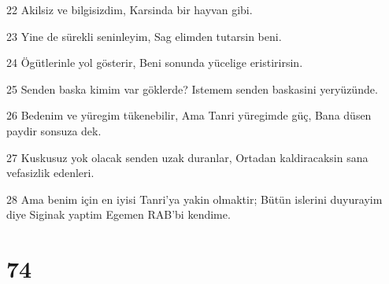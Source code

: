 \par 22 Akilsiz ve bilgisizdim, Karsinda bir hayvan gibi.
\par 23 Yine de sürekli seninleyim, Sag elimden tutarsin beni.
\par 24 Ögütlerinle yol gösterir, Beni sonunda yücelige eristirirsin.
\par 25 Senden baska kimim var göklerde? Istemem senden baskasini yeryüzünde.
\par 26 Bedenim ve yüregim tükenebilir, Ama Tanri yüregimde güç, Bana düsen paydir sonsuza dek.
\par 27 Kuskusuz yok olacak senden uzak duranlar, Ortadan kaldiracaksin sana vefasizlik edenleri.
\par 28 Ama benim için en iyisi Tanri'ya yakin olmaktir; Bütün islerini duyurayim diye Siginak yaptim Egemen RAB'bi kendime.

\chapter{74}

